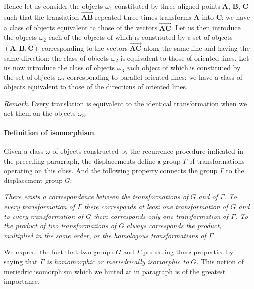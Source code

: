 Hence let us consider the objects $\omega_{1}$ constituted by three aligned points $\mathbf{A}$, $\mathbf{B}$, $\mathbf{C}$ such that the translation $\overrightarrow{\mathbf{AB}}$ repeated three times transforms $\mathbf{A}$ into $\mathbf{C}$: we have a class of objects equivalent to those of the vectors $\overrightarrow{\mathbf{AC}}$. Let us then introduce the objects $\omega_{2}$ each of the objects of which is constituted by a set of objects $(\mathbf{A}, \mathbf{B}, \mathbf{C})$ corresponding to the vectors $\overrightarrow{\mathbf{AC}}$ along the same line and having the same direction: the class of objects $\omega_{2}$ is equivalent to those of oriented lines. Let us now introduce the class of objects $\omega_{3}$ each object of which is constituted by the set of objects $\omega_{2}$ corresponding to parallel oriented lines: we have a class of objects equivalent to those of the directions of oriented lines.

\somespace

\emph{Remark.} Every translation is equivalent to the identical transformation when we act them on the objects $\omega_{3}$.

\paragraph{Definition of isomorphism.}
\label{sec:90}
Given a class $\omega$ of objects constructed by the recurrence procedure indicated in the preceding paragraph, the displacements define a group $\Gamma$ of transformations operating on this class. And the following property connects the group $\Gamma$ to the displacement group $G$:

\somespace

\emph{There exists a correspondence between the transformations of $G$ and of $\Gamma$. To every transformation of $\Gamma$ there corresponds at least one transformation of $G$ and to every transformation of $G$ there corresponds only one transformation of $\Gamma$. To the product of two transformations of $G$ always corresponds the product, multiplied in the same order, or the homologous transformations of $\Gamma$.}

\somespace

We express  the fact that two groups $G$ and $\Gamma$ possessing these properties by saying that \emph{$\Gamma$ is homomorphic or meriedrically isomorphic to $G$.} This notion of meriedric isomorphism which we hinted at in paragraph  is of the greatest importance.

